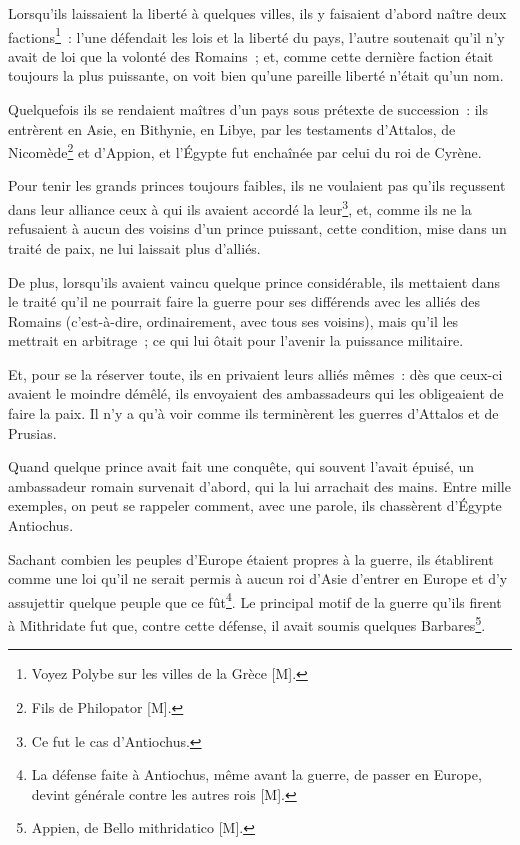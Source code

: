 \documentclass[french,twoside]{book} %
\begin{document}
Lorsqu’ils laissaient la liberté à quelques villes, ils y faisaient d’abord naître deux factions\footnote{Voyez Polybe sur les villes de la Grèce [M].} : l’une défendait les lois et la liberté du pays, l’autre soutenait qu’il n’y avait de loi que la volonté des Romains ; et, comme cette dernière faction était toujours la plus puissante, on voit bien qu’une pareille liberté n’était qu’un nom.\par
Quelquefois ils se rendaient maîtres d’un pays sous prétexte de succession : ils entrèrent en Asie, en Bithynie, en Libye, par les testaments d’Attalos, de Nicomède\footnote{Fils de Philopator [M].} et d’Appion, et l’Égypte fut enchaînée par celui du roi de Cyrène.\par
Pour tenir les grands princes toujours faibles, ils ne voulaient pas qu’ils reçussent dans leur alliance ceux à qui ils avaient accordé la leur\footnote{Ce fut le cas d’Antiochus.}, et, comme ils ne la refusaient à aucun des voisins d’un prince puissant, cette condition, mise dans un traité de paix, ne lui laissait plus d’alliés.\par
De plus, lorsqu’ils avaient vaincu quelque prince considérable, ils mettaient dans le traité qu’il ne pourrait faire la guerre pour ses différends avec les alliés des Romains (c’est-à-dire, ordinairement, avec tous ses voisins), mais qu’il les mettrait en arbitrage ; ce qui lui ôtait pour l’avenir la puissance militaire.\par
Et, pour se la réserver toute, ils en privaient leurs alliés mêmes : dès que ceux-ci avaient le moindre démêlé, ils envoyaient des ambassadeurs qui les obligeaient de faire la paix. Il n’y a qu’à voir comme ils terminèrent les guerres d’Attalos et de Prusias.\par
Quand quelque prince avait fait une conquête, qui souvent l’avait épuisé, un ambassadeur romain survenait d’abord, qui la lui arrachait des mains. Entre mille exemples, on peut se rappeler comment, avec une parole, ils chassèrent d’Égypte Antiochus.\par
Sachant combien les peuples d’Europe étaient propres à la guerre, ils établirent comme une loi qu’il ne serait permis à aucun roi d’Asie d’entrer en Europe et d’y assujettir quelque peuple que ce fût\footnote{La défense faite à Antiochus, même avant la guerre, de passer en Europe, devint générale contre les autres rois [M].}. Le principal motif de la guerre qu’ils firent à Mithridate fut que, contre cette défense, il avait soumis quelques Barbares\footnote{Appien, de Bello mithridatico [M].}.\par
\end{document}
